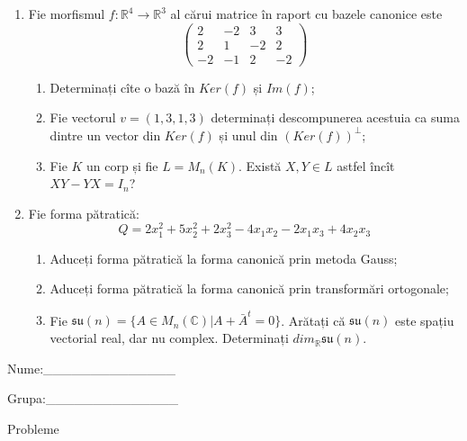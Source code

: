 \documentclass{article}
\begin{document}
\begin{enumerate}
 \item Fie morfismul $f:\mathbb{R}^4 \to \mathbb{R}^3$ al cărui matrice în raport cu bazele canonice este
$$\begin{pmatrix}
2&-2&3&3\\
2&1&-2&2\\
-2&-1&2&-2
\end{pmatrix}$$

\begin{enumerate}
\item Determinați cîte o bază în $Ker(f)$ și $Im(f)$;
\item Fie vectorul $v=(1,3,1,3)$ determinați descompunerea acestuia ca suma dintre un vector din $Ker(f)$ și unul din $(Ker(f))^\perp$;
\item Fie $K$ un corp și fie $L=M_n(K)$. Există $X,Y \in L$ astfel încît $XY-YX=I_n$?  
\end{enumerate}
\item Fie forma pătratică:
$$Q= 2x_1^2+5x_2^2+2x_3^2-4x_1x_2-2x_1x_3+4x_2x_3$$

\begin{enumerate}
\item Aduceți forma pătratică la forma canonică prin metoda Gauss;
\item Aduceți forma pătratică la forma canonică prin transformări ortogonale;
\item Fie $\mathfrak{su}(n)=\{ A \in M_n(\mathbb{C}) | A+\bar{A}^t=0\}$. Arătați că $\mathfrak{su}(n)$ este spațiu vectorial real, dar nu complex.
Determinați $dim_{\mathbb{R}}\mathfrak{su}(n)$.
\end{enumerate}
\end{enumerate}
\newpage
\begin{flushright}
Nume:\_\_\_\_\_\_\_\_\_\_\_\_\_\_
 
 
Grupa:\_\_\_\_\_\_\_\_\_\_\_\_\_\_
\end{flushright}
\begin{center}
\vspace{2cm}
{\Large Probleme}
\vspace{2cm}
\end{center}
\end{document}
